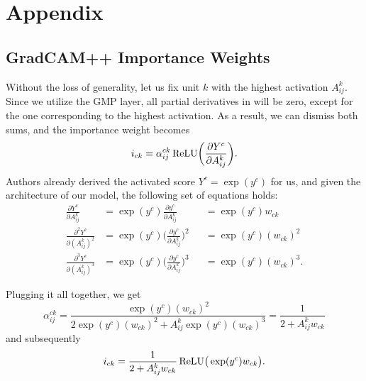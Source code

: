 {}

\renewcommand{\thechapter}{A}
\chapter{Appendix}

\section{GradCAM++ Importance Weights}\label{sec:grad-cam-plus-plus-weight-derivation}

Without the loss of generality, let us fix unit $k$ with the highest activation $A^k_{ij}$.
Since we utilize the GMP layer, all partial derivatives in  will be zero, except for the one corresponding to the highest activation.
As a result, we can dismiss both sums, and the importance weight becomes 
\begin{equation}
    i_{ck} = \alpha^{ck}_{ij} \operatorname{ReLU}\biggl(\frac{\partial Y^c}{\partial A^k_{ij}}\biggr).
\end{equation}
Authors already derived the activated score $Y^c = \exp(y^c)$ for us, and given the architecture of our model, the following set of equations holds:
\begin{equation}
\begin{aligned}
  \frac{\partial Y^c}{\partial A_{ij}^k}       &= \exp(y^c) \frac{\partial y^c}{\partial A_{ij}^k}     &&= \exp(y^c) w_{ck}     \\
  \frac{\partial^2 Y^c}{\partial (A_{ij}^k)^2} &= \exp(y^c) \biggl(\frac{\partial y^c}{\partial A_{ij}^k}\biggr)^2 &&= \exp(y^c) (w_{ck})^2 \\
  \frac{\partial^3 Y^c}{\partial (A_{ij}^k)^3} &= \exp(y^c) \biggl(\frac{\partial y^c}{\partial A_{ij}^k}\biggr)^3 &&= \exp(y^c) (w_{ck})^3.
\end{aligned}
\end{equation}

Plugging it all together, we get 
\begin{equation}
    \alpha_{ij}^{ck} = \frac{\exp(y^c) (w_{ck})^2}{2 \exp(y^c) (w_{ck})^2 + A^k_{ij} \exp(y^c) (w_{ck})^3} = \frac{1}{2 + A^k_{ij}w_{ck}}
\end{equation}
and subsequently
\begin{equation}
    i_{ck} = \frac{1}{2 + A^k_{ij}w_{ck}} \operatorname{ReLU}\bigr(\exp(y^c)w_{ck}\bigl).
\end{equation}

